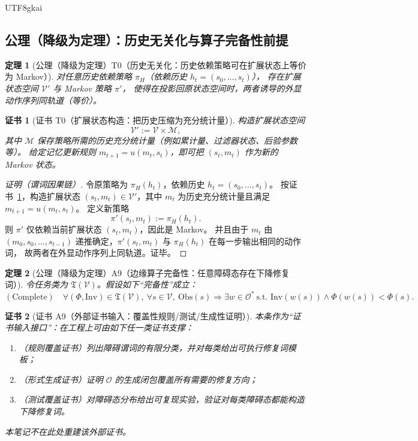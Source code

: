 \documentclass[12pt]{article}
\newtheorem{theorem}{定理}[section]
\newtheorem{Certificate}{证书}[section]
\begin{document}
\begin{CJK*}{UTF8}{gkai}
\subsection{公理（降级为定理）：历史无关化与算子完备性前提}
\label{subsec:tex27-ch9-axioms}

\begin{theorem}[公理（降级为定理）T0（历史无关化：历史依赖策略可在扩展状态上等价为 Markov）]
\label{thm:tex27-ch9-t0}
对任意历史依赖策略 $\pi_H$（依赖历史 $h_t=(s_0,\dots,s_t)$），
存在扩展状态空间 $\mathcal{V}'$ 与 Markov 策略 $\pi'$，
使得在投影回原状态空间时，两者诱导的外显动作序列同轨道（等价）。
\end{theorem}

\begin{Certificate}[证书 T0（扩展状态构造：把历史压缩为充分统计量）]
\label{cert:tex27-ch9-t0}
构造扩展状态空间
\[
  \mathcal{V}' := \mathcal{V}\times \mathcal{M},
\]
其中 $\mathcal{M}$ 保存策略所需的历史充分统计量（例如累计量、过滤器状态、后验参数等）。
给定记忆更新规则 $m_{t+1}=u(m_t,s_t)$，即可把 $(s_t,m_t)$ 作为新的 Markov 状态。
\end{Certificate}

\begin{proof}[证明（谓词因果链）]
令原策略为 $\pi_H(h_t)$，依赖历史 $h_t=(s_0,\dots,s_t)$。
按证书~\ref{cert:tex27-ch9-t0}，构造扩展状态 $(s_t,m_t)\in\mathcal{V}'$，其中 $m_t$ 为历史充分统计量且满足 $m_{t+1}=u(m_t,s_t)$。
定义新策略
\[
  \pi'(s_t,m_t):=\pi_H(h_t).
\]
则 $\pi'$ 仅依赖当前扩展状态 $(s_t,m_t)$，因此是 Markov。
并且由于 $m_t$ 由 $(m_0,s_0,\dots,s_{t-1})$ 递推确定，$\pi'(s_t,m_t)$ 与 $\pi_H(h_t)$ 在每一步输出相同的动作词，
故两者在外显动作序列上同轨道。证毕。
\end{proof}

\begin{theorem}[公理（降级为定理）A9（边缘算子完备性：任意障碍态存在下降修复词）]
\label{thm:tex27-ch9-a9}
令任务类为 $\mathfrak{T}(\mathcal{V})$。假设如下“完备性”成立：
\[
  (\mathrm{Complete})\quad
  \forall(\Phi,\mathrm{Inv})\in\mathfrak{T}(\mathcal{V}),\ \forall s\in\mathcal{V},\
  \mathrm{Obs}(s)\Rightarrow \exists w\in\mathcal{O}^*\ \text{s.t. }\mathrm{Inv}(w(s))\wedge \Phi(w(s))<\Phi(s).
\]
\end{theorem}

\begin{Certificate}[证书 A9（外部证书输入：覆盖性规则/测试/生成性证明）]
\label{cert:tex27-ch9-a9}
本条作为“证书输入接口”：在工程上可由如下任一类证书支撑：
\begin{enumerate}
  \item（规则覆盖证书）列出障碍谓词的有限分类，并对每类给出可执行修复词模板；
  \item（形式生成证书）证明 $\mathcal{O}$ 的生成闭包覆盖所有需要的修复方向；
  \item（测试覆盖证书）对障碍态分布给出可复现实验，验证对每类障碍态都能构造下降修复词。
\end{enumerate}
本笔记不在此处重建该外部证书。
\end{Certificate}


\end{CJK*}
\end{document}

